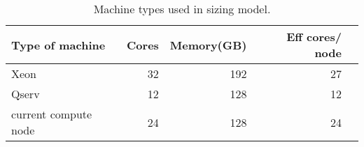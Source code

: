 \tiny \begin{longtable} { |p{}  |r  |r  |r  |r |} 
\caption{Machine types used in sizing model. \label{tab:idfmachines}}\\ 
\hline 
\textbf{Type of machine }&\textbf{Cores}&\textbf{Memory(GB)}&\textbf{Eff cores/ node} \\ \hline
{Xeon }&{32}&{192}&{27} \\ \hline
{Qserv }&{12}&{128}&{12} \\ \hline
{current compute node }&{24}&{128}&{24} \\ \hline
\end{longtable} \normalsize
